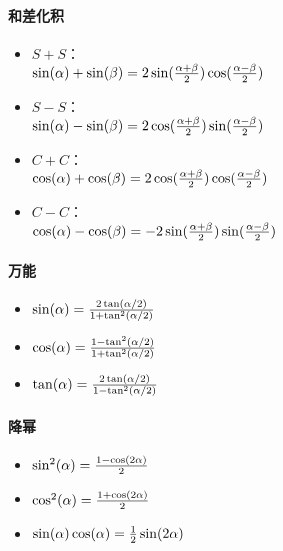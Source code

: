 \documentclass[
]{article}
\begin{document}
\hypertarget{ux548cux5deeux5316ux79ef}{%
\paragraph{和差化积}\label{ux548cux5deeux5316ux79ef}}

\begin{itemize}
\item
  \(S + S\)：\\
  \(\sin(\alpha) + \sin(\beta)=2\sin({{\alpha + \beta} \over 2})\cos({{\alpha - \beta} \over 2})\)
\item
  \(S - S\)：\\
  \(\sin(\alpha) - \sin(\beta) = 2\cos({{\alpha + \beta} \over 2})\sin ({{\alpha - \beta} \over 2})\)
\item
  \(C + C\)：\\
  \(\cos(\alpha) + \cos(\beta) = 2\cos({{\alpha + \beta} \over 2})\cos({{\alpha - \beta} \over 2})\)
\item
  \(C - C\)：\\
  \(\cos(\alpha) - \cos(\beta) = -2\sin({{\alpha + \beta} \over 2})\sin({{\alpha - \beta} \over 2})\)
\end{itemize}

\hypertarget{ux4e07ux80fd}{%
\paragraph{万能}\label{ux4e07ux80fd}}

\begin{itemize}
\item
  \(\sin(\alpha) = {2\tan(\alpha/2) \over {1 + \tan^2(\alpha/2)}}\)
\item
  \(\cos(\alpha) = {{1 - \tan^2(\alpha/2)} \over {1 + \tan^2(\alpha/2)}}\)
\item
  \( \tan(\alpha)= {2\tan(\alpha/2) \over {1 - \tan^2(\alpha/2)}}\)
\end{itemize}

\hypertarget{ux964dux5e42}{%
\paragraph{降幂}\label{ux964dux5e42}}

\begin{itemize}
\item
  \(\sin^2(\alpha) = {{1 - \cos(2\alpha)} \over 2}\)
\item
  \(\cos^2(\alpha) = {{1 + \cos(2\alpha)} \over 2}\)
\item
  \(\sin(\alpha)\cos(\alpha) = {1 \over 2}\sin(2\alpha)\)
\end{itemize}
\end{document}
